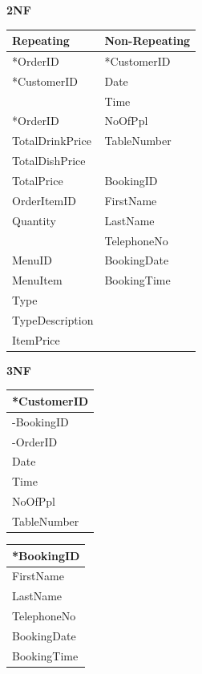 \begin{center}
\textbf{2NF} \\
\begin{tabular}{ | l | l |   }
    \hline
    \textbf{Repeating} & \textbf{Non-Repeating} \\ \hline
	 *OrderID& *CustomerID\\
	*CustomerID & Date\\
			 & Time \\	
	*OrderID & NoOfPpl\\
	TotalDrinkPrice & TableNumber\\
	TotalDishPrice & \\
	 TotalPrice &BookingID \\
	OrderItemID &FirstName\\
	Quantity&LastName\\
	          &TelephoneNo\\
	MenuID&BookingDate\\
	MenuItem&BookingTime \\
	Type& \\
	TypeDescription& \\
	ItemPrice& \\

     \hline
\end{tabular}
\label{tab:2nF}
\end{center}

\begin{center}
\textbf{3NF}
\end{center}

\begin{center}
\begin{tabular}{ | l |  }
    \hline
    \textbf{*CustomerID} \\ \hline
	-BookingID \\
	-OrderID \\
	Date \\
	Time \\
	NoOfPpl \\
	TableNumber \\

\hline
\end{tabular}
\label{tab:3nF}
\end{center}

\begin{center}
\begin{tabular}{ | l |   }
    \hline
    \textbf{*BookingID} \\ \hline

	FirstName\\
	LastName\\
	TelephoneNo \\
	BookingDate \\
	BookingTime \\
		
     \hline
\end{tabular}
\label{tab:3nF}
\end{center}


